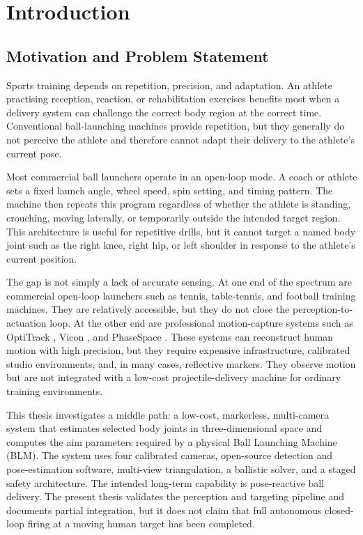 \chapter{Introduction}

\section{Motivation and Problem Statement}

Sports training depends on repetition, precision, and adaptation. An athlete practising reception, reaction, or rehabilitation exercises benefits most when a delivery system can challenge the correct body region at the correct time. Conventional ball-launching machines provide repetition, but they generally do not perceive the athlete and therefore cannot adapt their delivery to the athlete's current pose.

Most commercial ball launchers operate in an open-loop mode. A coach or athlete sets a fixed launch angle, wheel speed, spin setting, and timing pattern. The machine then repeats this program regardless of whether the athlete is standing, crouching, moving laterally, or temporarily outside the intended target region. This architecture is useful for repetitive drills, but it cannot target a named body joint such as the right knee, right hip, or left shoulder in response to the athlete's current position.

The gap is not simply a lack of accurate sensing. At one end of the spectrum are commercial open-loop launchers such as tennis, table-tennis, and football training machines. They are relatively accessible, but they do not close the perception-to-actuation loop. At the other end are professional motion-capture systems such as OptiTrack \cite{ref30}, Vicon \cite{ref8}, and PhaseSpace \cite{ref31}. These systems can reconstruct human motion with high precision, but they require expensive infrastructure, calibrated studio environments, and, in many cases, reflective markers. They observe motion but are not integrated with a low-cost projectile-delivery machine for ordinary training environments.

This thesis investigates a middle path: a low-cost, markerless, multi-camera system that estimates selected body joints in three-dimensional space and computes the aim parameters required by a physical Ball Launching Machine (BLM). The system uses four calibrated cameras, open-source detection and pose-estimation software, multi-view triangulation, a ballistic solver, and a staged safety architecture. The intended long-term capability is pose-reactive ball delivery. The present thesis validates the perception and targeting pipeline and documents partial integration, but it does not claim that full autonomous closed-loop firing at a moving human target has been completed.


